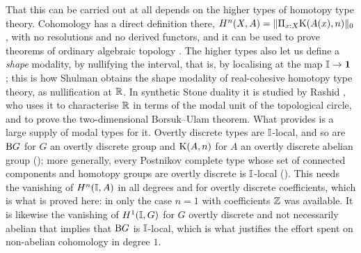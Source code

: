 That this can be carried out at all depends on the higher types of homotopy type
theory. Cohomology has a direct definition there, $H^n(X,A) =
\lVert \Pi_{x:X}{\mathrm{K}}(A(x),n) \rVert_0$, with no resolutions and no derived functors,
and it can be used to prove theorems of ordinary algebraic topology
\cite{hott,evan-master-thesis}. The higher types also let us define a \emph{shape}
modality, by nullifying the interval, that is, by localising at the map $\mathbb{I} \to
\mathbf{1}$ \cite{modalities}; this is how Shulman
\cite{shulman-Brouwer-fixed-point} obtains the shape modality of real-cohesive
homotopy type theory, as nullification at $\mathbb{R}$. In synthetic Stone duality it is
studied by Rashid \cite{rashid-borsuk-ulam}, who uses it to characterise $\mathbb{R}$ in
terms of the modal unit of the topological circle, and to prove the
two-dimensional Borsuk--Ulam theorem. What  provides
is a large supply of modal types for it. Overtly discrete types are $\mathbb{I}$-local,
and so are $\mathrm{B} G$ for $G$ an overtly discrete group and ${\mathrm{K}}(A,n)$ for $A$ an
overtly discrete abelian group (); more generally, every
Postnikov complete type whose set of connected components and homotopy groups are
overtly discrete is $\mathbb{I}$-local
(). This needs the vanishing of $H^n(\mathbb{I},A)$ in all
degrees and for overtly discrete coefficients, which is what is proved here: in
\cite{synthetic-stone-duality} only the case $n = 1$ with coefficients $\mathbb{Z}$ was
available. It is likewise the vanishing of $H^1(\mathbb{I},G)$ for $G$ overtly discrete
and not necessarily abelian that implies that $\mathrm{B} G$ is $\mathbb{I}$-local, which is what justifies
the effort spent on non-abelian cohomology in degree $1$.

